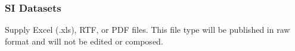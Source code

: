 \documentclass[9pt,twocolumn,twoside]{pnas-new}
\begin{document}
\subsubsection*{SI Datasets}

Supply Excel (.xls), RTF, or PDF files. This file type will be published in raw format and will not be edited or composed.


\matmethods{

}

\showmatmethods{}%


\showacknow{} %



\end{document}
